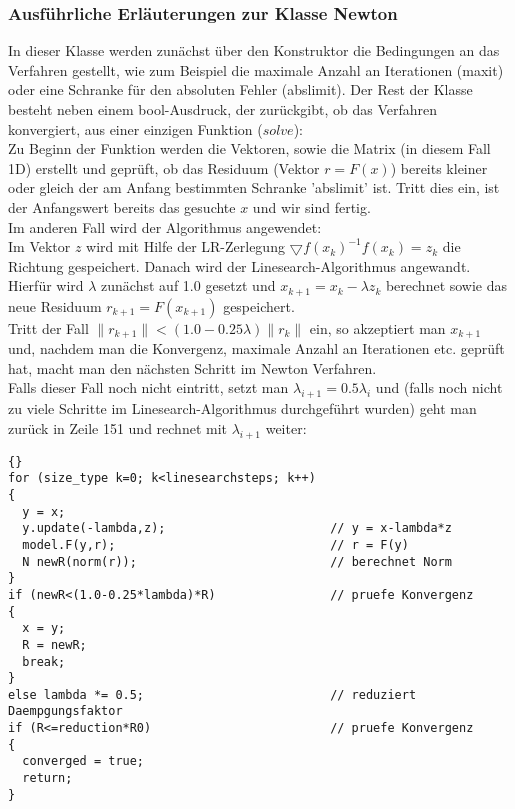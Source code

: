 \documentclass[a4paper,11pt]{article}
\theoremstyle{definition}
\begin{document}
\subsubsection{Ausführliche Erläuterungen zur Klasse Newton}
In dieser Klasse werden zunächst über den Konstruktor die Bedingungen an das Verfahren gestellt, wie zum Beispiel die maximale Anzahl an Iterationen (maxit) oder eine Schranke für den absoluten Fehler (abslimit).
Der Rest der Klasse besteht neben einem bool-Ausdruck, der zurückgibt, ob das Verfahren konvergiert, aus einer einzigen Funktion ($solve$):\\
Zu Beginn der Funktion werden die Vektoren, sowie die Matrix (in diesem Fall 1D) erstellt und geprüft, ob das Residuum (Vektor $r=F(x)$) bereits kleiner oder gleich der am Anfang bestimmten Schranke 'abslimit' ist. Tritt dies ein, ist der Anfangswert bereits das gesuchte $x$ und wir sind fertig.\\
Im anderen Fall wird der Algorithmus angewendet:\\
Im Vektor $z$ wird mit Hilfe der LR-Zerlegung $\bigtriangledown f(x_k)^{-1}f(x_k) = z_k$ die Richtung gespeichert.
Danach wird der Linesearch-Algorithmus angewandt. Hierfür wird $\lambda$ zunächst auf 1.0 gesetzt und $x_{k+1}=x_k-\lambda z_k$ berechnet sowie das neue Residuum $r_{k+1}=F(x_{k+1})$ gespeichert.\\
Tritt der Fall $\parallel r_{k+1}  \parallel < ( 1.0-0.25\lambda) \parallel r_k \parallel $ ein, so akzeptiert man $x_{k+1}$ und, nachdem man die Konvergenz, maximale Anzahl an Iterationen etc. geprüft hat, macht man den nächsten Schritt im Newton Verfahren.\\
Falls dieser Fall noch nicht eintritt, setzt man $\lambda_{i+1} = 0.5\lambda_i$ und (falls noch nicht zu viele Schritte im Linesearch-Algorithmus durchgeführt wurden) geht man zurück in Zeile 151 und rechnet mit $\lambda_{i+1} $ weiter:
{\footnotesize{\begin{lstlisting}{}
for (size_type k=0; k<linesearchsteps; k++)
{
  y = x;                                    
  y.update(-lambda,z);                       // y = x-lambda*z
  model.F(y,r);                              // r = F(y)
  N newR(norm(r));                           // berechnet Norm
}
if (newR<(1.0-0.25*lambda)*R)                // pruefe Konvergenz  
{ 
  x = y;
  R = newR;
  break;     
}
else lambda *= 0.5;                          // reduziert Daempgungsfaktor                                             
if (R<=reduction*R0)                         // pruefe Konvergenz
{  
  converged = true;
  return;
}  
      \end{lstlisting}}}
    
\end{document}
